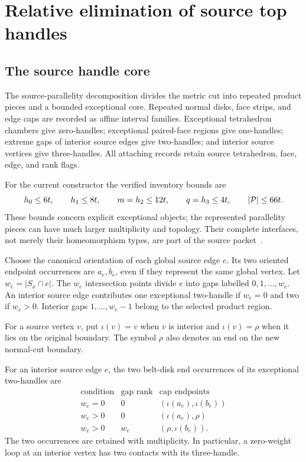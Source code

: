 \section{Relative elimination of source top handles}
\label{sec:relative}

\subsection{The source handle core}

The source-parallelity decomposition divides the metric cut into repeated
product pieces and a bounded exceptional core. Repeated normal disks, face
strips, and edge caps are recorded as affine interval families. Exceptional
tetrahedron chambers give zero-handles; exceptional paired-face regions give
one-handles; extreme gaps of interior source edges give two-handles; and
interior source vertices give three-handles. All attaching records retain
source tetrahedron, face, edge, and rank flags.

For the current constructor the verified inventory bounds are
\begin{equation}
 h_0\leq 6t,\qquad h_1\leq 8t,\qquad
 m=h_2\leq 12t,\qquad q=h_3\leq 4t,\qquad
 |\mathcal P|\leq 66t.
 \label{eq:core-bounds}
\end{equation}
These bounds concern explicit exceptional objects; the represented
parallelity pieces can have much larger multiplicity and topology. Their
complete interfaces, not merely their homeomorphism types, are part of the
source packet~\cite{repo}.

Choose the canonical orientation of each global source edge $e$. Its two
oriented endpoint occurrences are $a_e,b_e$, even if they represent the same
global vertex. Let $w_e=|S_x\cap e|$. The $w_e$ intersection points divide
$e$ into gaps labelled $0,1,\ldots,w_e$. An interior source edge contributes
one exceptional two-handle if $w_e=0$ and two if $w_e>0$. Interior gaps
$1,\ldots,w_e-1$ belong to the selected product region.

For a source vertex $v$, put $\iota(v)=v$ when $v$ is interior and
$\iota(v)=\rho$ when it lies on the original boundary. The symbol $\rho$
also denotes an end on the new normal-cut boundary.

\begin{lemma}
\label{lem:caps}
For an interior source edge $e$, the two belt-disk end occurrences of its
exceptional two-handles are
\[
\begin{array}{c|c|c}
 \text{condition}&\text{gap rank}&\text{cap endpoints}\\\hline
 w_e=0&0&(\iota(a_e),\iota(b_e))\\
 w_e>0&0&(\iota(a_e),\rho)\\
 w_e>0&w_e&(\rho,\iota(b_e)).
\end{array}
\]
The two occurrences are retained with multiplicity. In particular, a
zero-weight loop at an interior vertex has two contacts with its
three-handle.
\end{lemma}

